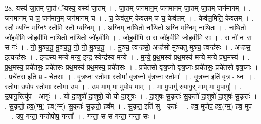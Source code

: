 \documentclass[17pt]{extarticle}
\begin{document}
28. यस्य॑ जा॒तम् जा॒तं ॅयस्य॒ यस्य॑ जा॒तम् । . जा॒तम् जन॑मान॒म् जन॑मानम् जा॒तम् जा॒तम् जन॑मानम् । . जन॑मानम् च च॒ जन॑मान॒म् जन॑मानम् च । . च॒ केव॑ल॒म् केव॑लम् च च॒ केव॑लम् । . केव॑ल॒मिति॒ केव॑लम् । . स्तौ म्य॒ग्नि म॒ग्निꣳ स्तौमि॒ स्तौ म्य॒ग्निम् । . अ॒ग्निम् ना॑थि॒तो ना॑थि॒तो अ॒ग्नि म॒ग्निम् ना॑थि॒तः । . ना॒थि॒तो जो॑हवीमि जोहवीमि नाथि॒तो ना॑थि॒तो जो॑हवीमि । . जो॒ह॒वी॒मि॒ स स जो॑हवीमि जोहवीमि॒ सः । . स नो॑ नः॒ स स नः॑ । . नो॒ मु॒ञ्च॒तु॒ मु॒ञ्च॒तु॒ नो॒ नो॒ मु॒ञ्च॒तु॒ । . मु॒ञ्च॒ त्वꣳह॑सो॒ अꣳह॑सो मुञ्चतु मुञ्च॒ त्वꣳह॑सः । . अꣳह॑स॒ इत्यꣳह॑सः । . इन्द्र॑स्य मन्ये मन्य॒ इन्द्र॒ स्येन्द्र॑स्य मन्ये । . म॒न्ये॒ प्र॒थ॒मस्य॑ प्रथ॒मस्य॑ मन्ये मन्ये प्रथ॒मस्य॑ । . प्र॒थ॒मस्य॒ प्रचे॑तसः॒ प्रचे॑तसः प्रथ॒मस्य॑ प्रथ॒मस्य॒ प्रचे॑तसः । . प्रचे॑तसो वृत्र॒घ्नो वृ॑त्र॒घ्नः प्रचे॑तसः॒ प्रचे॑तसो वृत्र॒घ्नः । . प्रचे॑तस॒ इति॒ प्र - चे॒त॒सः॒ । . वृ॒त्र॒घ्नः स्तोमाः॒ स्तोमा॑ वृत्र॒घ्नो वृ॑त्र॒घ्नः स्तोमाः᳚ । . वृ॒त्र॒घ्न इति॑ वृत्र - घ्नः । . स्तोमा॒ उपोप॒ स्तोमाः॒ स्तोमा॒ उप॑ । . उप॒ माम् मा मुपोप॒ माम् । . मा मु॒पागु॑ रु॒पागु॒र् माम् मा मु॒पागुः॑ । . उ॒पागु॒रित्यु॑प - आगुः॑ । . यो दा॒शुषो॑ दा॒शुषो॒ यो यो दा॒शुषः॑ । . दा॒शुषः॑ सु॒कृतः॑ सु॒कृतो॑ दा॒शुषो॑ दा॒शुषः॑ सु॒कृतः॑ । . सु॒कृतो॒ हव॒(ग्म्॒) हव(ग्म्॑) सु॒कृतः॑ सु॒कृतो॒ हव᳚म् । . सु॒कृत॒ इति॑ सु - कृतः॑ । . हव॒ मुपोप॒ हव॒(ग्म्॒) हव॒ मुप॑ । . उप॒ गन्ता॒ गन्तोपोप॒ गन्ता᳚ । . गन्ता॒ स स गन्ता॒ गन्ता॒ सः । \newline
\end{document}
